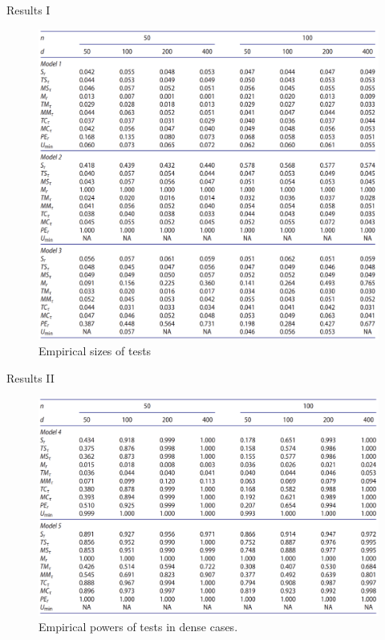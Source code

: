 \documentclass[
  ignorenonframetext,
]{beamer}
\begin{document}
\begin{frame}{Results I}
\label{results-i}
\begin{figure}

{\centering \includegraphics[width=0.8\linewidth,height=0.77\textheight]{Figures/Table1} 

}

\caption{Empirical sizes of tests}\label{fig:Table 1}
\end{figure}
\end{frame}

\begin{frame}{Results II}
\label{results-ii}
\begin{figure}

{\centering \includegraphics[width=0.8\linewidth]{Figures/Table2} 

}

\caption{Empirical powers of tests in dense cases.}\label{fig:Table 2}
\end{figure}
\end{frame}
\end{document}
